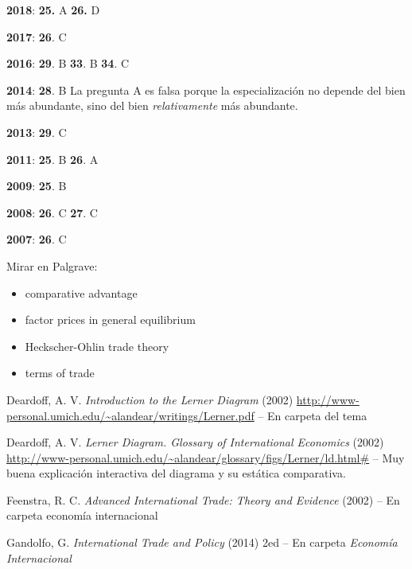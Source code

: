 \documentclass{nuevotema}
\begin{document}
\notas

\textbf{2018}: \textbf{25.} A \textbf{26.} D

\textbf{2017}: \textbf{26}. C

\textbf{2016}: \textbf{29}. B \textbf{33}. B \textbf{34}. C

\textbf{2014}: \textbf{28}. B La pregunta A es falsa porque la especialización no depende del bien más abundante, sino del bien \textit{relativamente} más abundante.

\textbf{2013}: \textbf{29}. C

\textbf{2011}: \textbf{25}. B \textbf{26}. A

\textbf{2009}: \textbf{25}. B

\textbf{2008}: \textbf{26}. C \textbf{27}. C

\textbf{2007}: \textbf{26}. C

\bibliografia

Mirar en Palgrave:
\begin{itemize}
	\item comparative advantage
	\item factor prices in general equilibrium
	\item Heckscher-Ohlin trade theory
	\item terms of trade
\end{itemize}

Deardoff, A. V. \textit{Introduction to the Lerner Diagram} (2002) \url{http://www-personal.umich.edu/~alandear/writings/Lerner.pdf} -- En carpeta del tema

Deardoff, A. V. \textit{Lerner Diagram. Glossary of International Economics} (2002) \url{http://www-personal.umich.edu/~alandear/glossary/figs/Lerner/ld.html#} -- Muy buena explicación interactiva del diagrama y su estática comparativa.

Feenstra, R. C. \textit{Advanced International Trade: Theory and Evidence} (2002) -- En carpeta economía internacional

Gandolfo, G. \textit{International Trade and Policy} (2014) 2ed -- En carpeta \textit{Economía Internacional}
\end{document}
